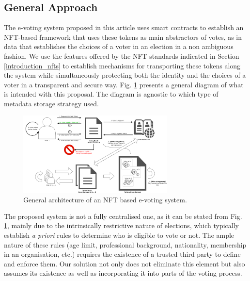\documentclass[../main.tex]{subfiles}
\begin{document}
\subsection{General Approach}
The e-voting system proposed in this article uses smart contracts to establish an NFT-based framework that uses these tokens as main abstractors of votes, as in data that establishes the choices of a voter in an election in a non ambiguous fashion. We use the features offered by the NFT standards indicated in Section \ref{introduction_nfts} to establish mechanisms for transporting these tokens along the system while simultaneously protecting both the identity and the choices of a voter in a transparent and secure way. Fig. \ref{fig:general_architecture} presents a general diagram of what is intended with this proposal. The diagram is agnostic to which type of metadata storage strategy used.

\begin{figure}[htp]
    \centering
    \includegraphics[width=0.7\textwidth]{../Images/01_general_solution.png}
    \caption{General architecture of an NFT based e-voting system.}
    \label{fig:general_architecture}
\end{figure}

The proposed system is not a fully centralised one, as it can be stated from Fig. \ref{fig:general_architecture}, mainly due to the intrinsically restrictive nature of elections, which typically establish \textit{a priori} rules to determine who is eligible to vote or not. The ample nature of these rules (age limit, professional background, nationality, membership in an organisation, etc.) requires the existence of a trusted third party to define and enforce them. Our solution not only does not eliminate this element but also assumes its existence as well as incorporating it into parts of the voting process.
\end{document}
